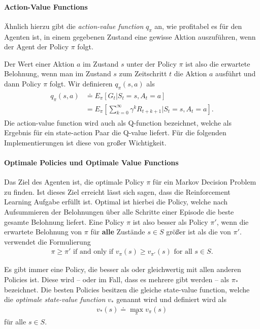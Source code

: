 \paragraph{Action-Value Functions}
Ähnlich hierzu gibt die \textit{action-value function} $ q_\pi $ an, wie profitabel es für den Agenten ist, in einem gegebenen Zustand eine gewisse Aktion auszuführen, wenn der Agent der Policy $ \pi $ folgt.

Der Wert einer Aktion $ a $ im Zustand $ s $ unter der Policy $ \pi $ ist also die erwartete Belohnung, wenn man im Zustand $ s $ zum Zeitschritt $ t $ die Aktion $ a $ ausführt und dann Policy $ \pi $ folgt. Wir definieren $ q_\pi(s, a) $ als
\begin{align}
    \begin{split}
    q_\pi(s,a) & \doteq E_\pi \left[G_t | S_t = s, A_t = a \right]\\
    & = E_\pi \left[\sum_{k = 0}^{\infty} \gamma^k R_{t + k + 1} | S_t = s, A_t = a \right].
    \end{split}
\end{align}
Die action-value function wird auch als Q-function bezeichnet, welche als Ergebnis für ein state-action Paar die Q-value liefert. Für die folgenden Implementierungen ist diese von großer Wichtigkeit.

\paragraph{Optimale Policies und Optimale Value Functions}
Das Ziel des Agenten ist, die optimale Policy $ \pi $ für ein Markov Decision Problem zu finden. Ist dieses Ziel erreicht lässt sich sagen, dass die Reinforcement Learning Aufgabe erfüllt ist. Optimal ist hierbei die Policy, welche nach Aufsummieren der Belohnungen über alle Schritte einer Episode die beste gesamte Belohnung liefert. Eine Policy $ \pi $ ist also besser als Policy $ \pi' $, wenn die erwartete Belohnung von $ \pi $ für \textbf{alle} Zustände $ s \in S $ größer ist als die von $ \pi' $. \cite{06_sutton2018reinforcement} verwendet die Formulierung
\begin{align}
    \pi \geq \pi' \text{ if and only if } v_\pi(s) \geq v_{\pi'}(s) \text{ for all } s \in S.
\end{align}

Es gibt immer eine Policy, die besser als oder gleichwertig mit allen anderen Policies ist. Diese wird -- oder im Fall, dass es mehrere gibt werden -- als $ \pi_* $ bezeichnet. Die besten Policies besitzen die gleiche state-value function, welche die \textit{optimale state-value function} $ v_* $ genannt wird und definiert wird als
\begin{align}
    v_*(s) \doteq \max_\pi v_\pi(s)
\end{align}
für alle $ s \in S $.


